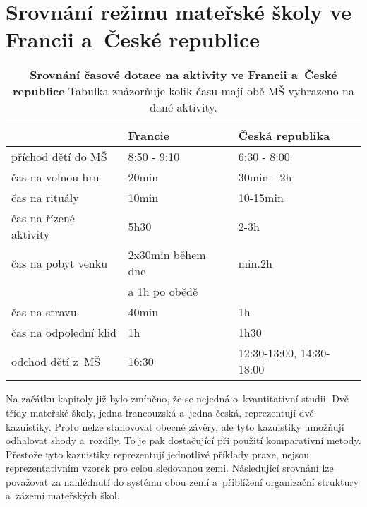 \section{Srovnání režimu mateřské školy ve Francii a~České republice} 
\label{srovnani} 

\begin{table}[h]
	\center
	\begin{tabular}{|l|l|l|}
	\hline
	\rowcolor{grey}
								& \textbf{Francie}				& \textbf{Česká republika}	\\
	\hline
	\hline
\rowcolor{grey!10}	 příchod dětí do MŠ			& 8:50 - 9:10				& 6:30 - 8:00			\\ 
\rowcolor{grey!50}	 čas na volnou hru 			& 20min 					&30min - 2h 	\\ 
\rowcolor{grey!10}	 čas na rituály 			&10min 						&10-15min \\
\rowcolor{grey!50}	 čas na řízené aktivity		&5h30 						&2-3h   \\ 
\rowcolor{grey!10}	 čas na pobyt venku     	&2x30min během dne			&min.2h 	\\ 
\rowcolor{grey!10}								&a 1h po obědě				& \\ 
\rowcolor{grey!50}	 čas na stravu				&40min						&1h \\
\rowcolor{grey!10}	 čas na odpolední klid 	 	&1h 						&1h30 	\\
\rowcolor{grey!50}	 odchod dětí z~MŠ			&16:30						&12:30-13:00, 14:30-18:00	\\														 
	 \hline
	  
	\end{tabular}
	
	\caption{ \textbf{Srovnání časové dotace na aktivity ve Francii a~České republice} Tabulka znázorňuje kolik času mají obě MŠ vyhrazeno na dané aktivity.
	}
	\label{srovnanirezimdne}
\end{table}


	Na začátku kapitoly již bylo zmíněno, že se nejedná o~kvantitativní studii. Dvě třídy mateřské školy, jedna francouzská a~jedna česká, reprezentují dvě kazuistiky. Proto nelze stanovovat obecné závěry, ale tyto kazuistiky umožňují odhalovat shody a~rozdíly. To je pak dostačující při použití komparativní metody. Přestože tyto kazuistiky reprezentují jednotlivé příklady praxe, nejsou reprezentativním vzorek pro celou sledovanou zemi. Následující srovnání lze považovat za nahlédnutí do systému obou zemí a~přiblížení organizační struktury a~zázemí mateřských škol.

